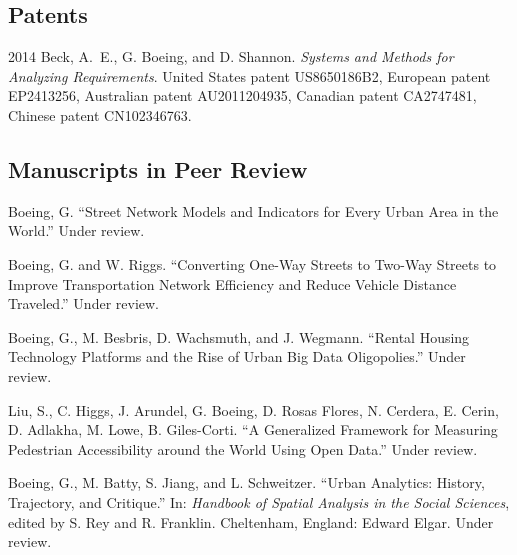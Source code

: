 \documentclass[12pt,letterpaper]{report}
\begin{document}
    \subsection*{Patents}

    \begin{tablist}

        \item[2014] \tab Beck, A.~E., G. Boeing, and D. Shannon. \textit{Systems and Methods for Analyzing Requirements}. United States patent US8650186B2, European patent EP2413256, Australian patent AU2011204935, Canadian patent CA2747481, Chinese patent CN102346763.

    \end{tablist}



    \subsection*{Manuscripts in Peer Review}

    \begin{tablist}

        \item[\the\year] \tab Boeing, G. \enquote{Street Network Models and Indicators for Every Urban Area in the World.} Under review.

        \item[\the\year] \tab Boeing, G. and W. Riggs. \enquote{Converting One-Way Streets to Two-Way Streets to Improve Transportation Network Efficiency and Reduce Vehicle Distance Traveled.} Under review.

        \item[\the\year] \tab Boeing, G., M. Besbris, D. Wachsmuth, and J. Wegmann. \enquote{Rental Housing Technology Platforms and the Rise of Urban Big Data Oligopolies.} Under review.

        \item[\the\year] \tab Liu, S., C. Higgs, J. Arundel, G. Boeing, D. Rosas Flores, N. Cerdera, E. Cerin, D. Adlakha, M. Lowe, B. Giles-Corti. \enquote{A Generalized Framework for Measuring Pedestrian Accessibility around the World Using Open Data.} Under review.

        \item[\the\year] \tab Boeing, G., M. Batty, S. Jiang, and L. Schweitzer. \enquote{Urban Analytics: History, Trajectory, and Critique.} In: \textit{Handbook of Spatial Analysis in the Social Sciences}, edited by S. Rey and R. Franklin. Cheltenham, England: Edward Elgar. Under review.

    \end{tablist}
\end{document}
